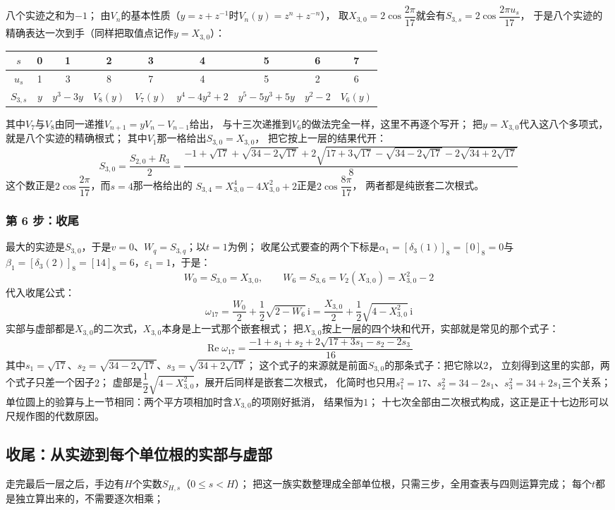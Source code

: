 \documentclass[UTF8,a4paper,11pt]{ctexart}
\newcommand{\ii}{\mathrm{i}}
\begin{document}
八个实迹之和为$-1$；
由$V_n$的基本性质（$y=z+z^{-1}$时$V_n(y)=z^n+z^{-n}$），
取$X_{3,0}=2\cos\dfrac{2\pi}{17}$就会有$S_{3,s}=2\cos\dfrac{2\pi u_s}{17}$，
于是八个实迹的精确表达一次到手（同样把取值点记作$y=X_{3,0}$）：
\begin{center}
\begin{tabular}{c|cccccccc}
\toprule
$s$ & 0&1&2&3&4&5&6&7\\
\midrule
$u_s$ & 1&3&8&7&4&5&2&6\\
$S_{3,s}$ & $y$ & $y^3-3y$ & $V_8(y)$ & $V_7(y)$
 & $y^4-4y^2+2$ & $y^5-5y^3+5y$ & $y^2-2$ & $V_6(y)$\\
\bottomrule
\end{tabular}
\end{center}
其中$V_7$与$V_8$由同一递推$V_{n+1}=yV_n-V_{n-1}$给出，
与十三次递推到$V_6$的做法完全一样，这里不再逐个写开；
把$y=X_{3,0}$代入这八个多项式，就是八个实迹的精确根式；
其中$V_1$那一格给出$S_{3,0}=X_{3,0}$，
把它按上一层的结果代开：
\[
 S_{3,0}=\frac{S_{2,0}+R_3}{2}
 =\frac{-1+\sqrt{17}+\sqrt{34-2\sqrt{17}}
 +2\sqrt{17+3\sqrt{17}-\sqrt{34-2\sqrt{17}}-2\sqrt{34+2\sqrt{17}}}}{8}
\]
这个数正是$2\cos\dfrac{2\pi}{17}$，而$s=4$那一格给出的
$S_{3,4}=X_{3,0}^4-4X_{3,0}^2+2$正是$2\cos\dfrac{8\pi}{17}$，
两者都是纯嵌套二次根式。

\subsubsection{第 6 步：收尾}
最大的实迹是$S_{3,0}$，于是$v=0$、$W_q=S_{3,q}$；以$t=1$为例；
收尾公式要查的两个下标是$\alpha_1=[\delta_3(1)]_8=[0]_8=0$与
$\beta_1=[\delta_3(2)]_8=[14]_8=6$，$\varepsilon_1=1$，于是：
\[
 W_0=S_{3,0}=X_{3,0},\qquad W_6=S_{3,6}=V_2(X_{3,0})=X_{3,0}^2-2
\]
代入收尾公式：
\[
 \omega_{17}=\frac{W_0}{2}+\frac12\sqrt{2-W_6}\,\ii
 =\frac{X_{3,0}}{2}+\frac12\sqrt{4-X_{3,0}^2}\,\ii
\]
实部与虚部都是$X_{3,0}$的二次式，$X_{3,0}$本身是上一式那个嵌套根式；
把$X_{3,0}$按上一层的四个块和代开，实部就是常见的那个式子：
\[
 \operatorname{Re}\omega_{17}
 =\frac{-1+s_1+s_2+2\sqrt{17+3s_1-s_2-2s_3}}{16}
\]
其中$s_1=\sqrt{17}$、$s_2=\sqrt{34-2\sqrt{17}}$、$s_3=\sqrt{34+2\sqrt{17}}$；
这个式子的来源就是前面$S_{3,0}$的那条式子：把它除以$2$，
立刻得到这里的实部，两个式子只差一个因子$2$；
虚部是$\dfrac12\sqrt{4-X_{3,0}^2}$，展开后同样是嵌套二次根式，
化简时也只用$s_1^2=17$、$s_2^2=34-2s_1$、$s_3^2=34+2s_1$三个关系；
单位圆上的验算与上一节相同：两个平方项相加时含$X_{3,0}$的项刚好抵消，
结果恒为$1$；
十七次全部由二次根式构成，这正是正十七边形可以尺规作图的代数原因。
\subsection{收尾：从实迹到每个单位根的实部与虚部}
走完最后一层之后，手边有$H$个实数$S_{H,s}$（$0\le s<H$）；
把这一族实数整理成全部单位根，只需三步，全用查表与四则运算完成；
每个$t$都是独立算出来的，不需要逐次相乘；
\end{document}
